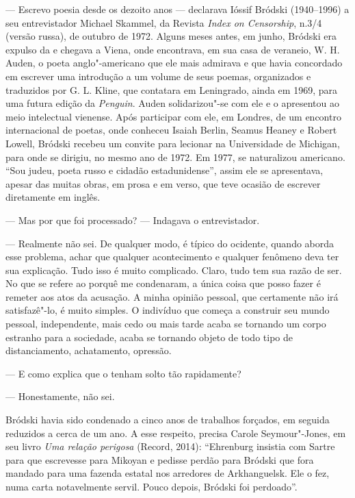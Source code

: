 --- Escrevo poesia desde os dezoito anos --- declarava Ióssif Bródski
(1940--1996) a seu entrevistador Michael Skammel, da Revista \emph{Index
on Censorship}, n.3/4 (versão russa), de outubro de 1972. Alguns meses
antes, em junho, Bródski era expulso da  e chegava a Viena, onde
encontrava, em sua casa de veraneio, W. H. Auden, o poeta
anglo"-americano que ele mais admirava e que havia concordado em escrever
uma introdução a um volume de seus poemas, organizados e traduzidos por
G. L. Kline, que contatara em Leningrado, ainda em 1969, para uma
futura edição da \emph{Penguin}. Auden solidarizou"-se com ele e o apresentou ao
meio intelectual vienense. Após participar com ele, em Londres, de um
encontro internacional de poetas, onde conheceu Isaiah Berlin, Seamus
Heaney e Robert Lowell, Bródski recebeu um convite para lecionar na
Universidade de Michigan, para onde se dirigiu, no mesmo ano de 1972. Em
1977, se naturalizou americano. ``Sou judeu, poeta russo e cidadão
estadunidense'', assim ele se apresentava, apesar das muitas obras, em
prosa e em verso, que teve ocasião de escrever diretamente em inglês.

--- Mas por que foi processado? --- Indagava o entrevistador.

--- Realmente não sei. De qualquer modo, é típico do ocidente, quando
aborda esse problema, achar que qualquer acontecimento e qualquer
fenômeno deva ter sua explicação. Tudo isso é muito complicado. Claro,
tudo tem sua razão de ser. No que se refere ao porquê me condenaram, a
única coisa que posso fazer é remeter aos atos da acusação. A minha
opinião pessoal, que certamente não irá satisfazê"-lo, é muito simples. O
indivíduo que começa a construir seu mundo pessoal, independente, mais
cedo ou mais tarde acaba se tornando um corpo estranho para a sociedade,
acaba se tornando objeto de todo tipo de distanciamento, achatamento,
opressão.

--- E como explica que o tenham solto tão rapidamente?

--- Honestamente, não sei.

Bródski havia sido condenado a cinco anos de trabalhos forçados, em
seguida reduzidos a cerca de um ano. A esse respeito, precisa Carole
Seymour"-Jones, em seu livro \emph{Uma relação perigosa} (Record, 2014): ``Ehrenburg
insistia com Sartre para que escrevesse para Mikoyan e pedisse perdão
para Bródski que fora mandado para uma fazenda estatal nos arredores de
Arkhanguelsk. Ele o fez, numa carta notavelmente servil. Pouco depois,
Bródski foi perdoado''.

